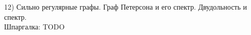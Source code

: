 12) Сильно регулярные графы. Граф Петерсона и его спектр. Двудольность и спектр.\\
Шпаргалка: TODO\\
